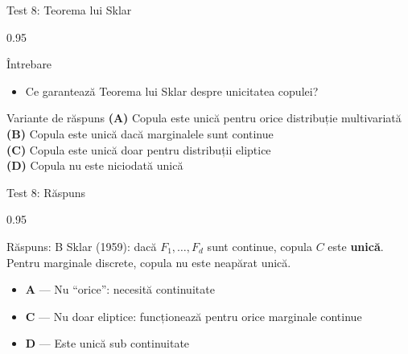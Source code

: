 \documentclass[9pt, aspectratio=169, t]{beamer}
\begin{document}
\begin{frame}{Test 8: Teorema lui Sklar}
\begin{cminipage}{0.95\textwidth}
    \begin{alertblock}{Întrebare}
        \begin{itemize}\setlength{\itemsep}{0pt}
            \item Ce garantează Teorema lui Sklar despre unicitatea copulei?
        \end{itemize}
    \end{alertblock}

    \vspace{0.3cm}

    \begin{block}{Variante de răspuns}
        \textcolor{MainBlue}{\textbf{(A)}} Copula este unică pentru orice distribuție multivariată\\[3pt]
        \textcolor{MainBlue}{\textbf{(B)}} Copula este unică dacă marginalele sunt continue\\[3pt]
        \textcolor{MainBlue}{\textbf{(C)}} Copula este unică doar pentru distribuții eliptice\\[3pt]
        \textcolor{MainBlue}{\textbf{(D)}} Copula nu este niciodată unică
    \end{block}
\end{cminipage}
\end{frame}

\begin{frame}{Test 8: Răspuns}
\begin{cminipage}{0.95\textwidth}
    \begin{exampleblock}{Răspuns: B}
        Sklar (1959): dacă $F_1, \ldots, F_d$ sunt continue, copula $C$ este \textbf{unică}. Pentru marginale discrete, copula nu este neapărat unică.
    \end{exampleblock}

    \vspace{0.2cm}

    \begin{itemize}\setlength{\itemsep}{0pt}
        \item \textbf{A} --- Nu ``orice'': necesită continuitate \incorrect
        \item \textbf{C} --- Nu doar eliptice: funcționează pentru orice marginale continue \incorrect
        \item \textbf{D} --- Este unică sub continuitate \incorrect
    \end{itemize}
\end{cminipage}
\end{frame}
\end{document}

